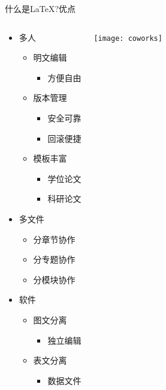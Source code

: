 \documentclass[xcolor=svgnames, t, aspectratio=169]{ctexbeamer}
\begin{document}
\begin{frame}[t]{什么是\LaTeX?}{优点}
  \vspace{-3ex}
  \begin{columns}%
  \begin{spacing}{0.7}
    \begin{itemize}
    \item \alert{多人}
      \begin{itemize}
      \item 明文编辑
        \begin{itemize}
        \item 方便自由
        \end{itemize}
      \item 版本管理
        \begin{itemize}
        \item 安全可靠
        \item 回滚便捷
        \end{itemize}
      \item 模板丰富
        \begin{itemize}
        \item 学位论文
        \item 科研论文
        \end{itemize}
      \end{itemize}
    \item \alert{多文件}
      \begin{itemize}
      \item 分章节协作
      \item 分专题协作
      \item 分模块协作
      \end{itemize}
    \item \alert{软件}
      \begin{itemize}
      \item 图文分离
        \begin{itemize}
        \item 独立编辑
        \end{itemize}
      \item 表文分离
        \begin{itemize}
        \item 数据文件
        \end{itemize}
      \end{itemize}
    \end{itemize}
  \end{spacing}
  \begin{center}
    \texttt{[image: coworks]}
  \end{center}
\end{columns}
\end{frame}
\end{document}
